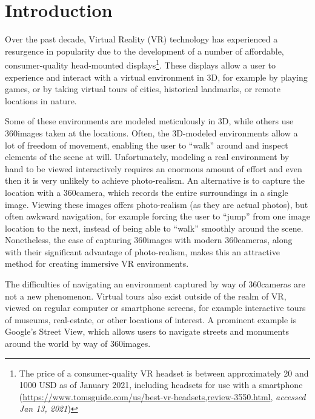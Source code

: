\chapter{Introduction}

Over the past decade, Virtual Reality (VR) technology has experienced a resurgence in popularity due to the development of a number of affordable, consumer-quality head-mounted displays\footnote{The price of a consumer-quality VR headset is between approximately 20 and 1000 USD as of January 2021, including headsets for use with a smartphone (\url{https://www.tomsguide.com/us/best-vr-headsets,review-3550.html}, \emph{accessed Jan 13, 2021})}. These displays allow a user to experience and interact with a virtual environment in 3D, for example by playing games, or by taking virtual tours of cities, historical landmarks, or remote locations in nature.

Some of these environments are modeled meticulously in 3D, while others use 360\degree images taken at the locations. Often, the 3D-modeled environments allow a lot of freedom of movement, enabling the user to ``walk'' around and inspect elements of the scene at will. Unfortunately, modeling a real environment by hand to be viewed interactively requires an enormous amount of effort and even then it is very unlikely to achieve photo-realism. An alternative is to capture the location with a 360\degree camera, which records the entire surroundings in a single image. Viewing these images offers photo-realism (as they are actual photos), but often awkward navigation, for example forcing the user to ``jump'' from one image location to the next, instead of being able to ``walk'' smoothly around the scene. Nonetheless, the ease of capturing 360\degree images with modern 360\degree cameras, along with their significant advantage of photo-realism, makes this an attractive method for creating immersive VR environments.

The difficulties of navigating an environment captured by way of 360\degree cameras are not a new phenomenon. Virtual tours also exist outside of the realm of VR, viewed on regular computer or smartphone screens, for example interactive tours of museums, real-estate, or other locations of interest. A prominent example is Google's Street View, which allows users to navigate streets and monuments around the world by way of 360\degree images.

